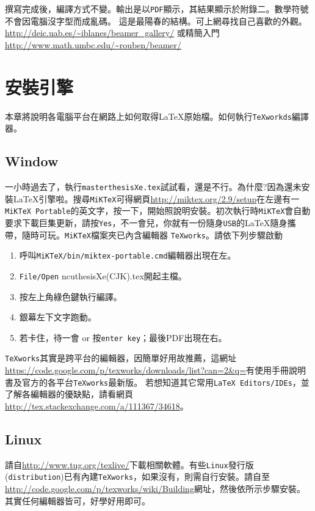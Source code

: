 撰寫完成後，編譯方式不變。輸出是以{\tt PDF}顯示，其結果顯示於附錄二。數學符號不會因電腦沒字型而成亂碼。
這是最陽春的結構。可上網尋找自己喜歡的外觀。\url{http://deic.uab.es/~iblanes/beamer_gallery/}
或精簡入門\url{http://www.math.umbc.edu/~rouben/beamer/}


\chapter{安裝引擎}
本章將說明各電腦平台在網路上如何取得\LaTeX{}原始檔。如何執行{\tt TeXworkds}編譯器。
\section{Window}
一小時過去了，執行{\tt masterthesisXe.tex}試試看，還是不行。為什麼?因為還未安裝\LaTeX{}引擎啦。搜尋{\tt MiKTeX}可得網頁\url{http://miktex.org/2.9/setup}在左邊有一{\tt MiKTeX Portable}的英文字，按一下，開始照說明安裝。初次執行時{\tt MiKTeX}會自動要求下載巨集更新，請按{\tt Yes}，不一會兒，你就有一份隨身{\tt USB}的\LaTeX{}隨身攜帶，隨時可玩。{\tt MiKTeX}檔案夾已內含編輯器 {\tt TeXworks}。請依下列步驟啟動

\begin{enumerate}
\item 呼叫{\tt MiKTeX/bin/miktex-portable.cmd}編輯器出現在左。
\item {\tt File/Open} ncuthesisXe(CJK).tex開起主檔。
\item 按左上角綠色鍵執行編譯。
\item 銀幕左下文字跑動。
\item 若卡住，待一會 or 按{\tt enter key}；最後PDF出現在右。
\end{enumerate}

{\tt TeXworks}其實是跨平台的編輯器，因簡單好用故推薦，這網址
\url{https://code.google.com/p/texworks/downloads/list?can=2&q=}有使用手冊說明書及官方的各平台{\tt TeXworks}最新版。
若想知道其它常用{\tt \LaTeX\ Editors/IDEs}，並了解各編輯器的優缺點，請看網頁\url{http://tex.stackexchange.com/a/111367/34618}。
\section{Linux}
請自\url{http://www.tug.org/texlive/}下載相關軟體。有些{\tt Linux}發行版({\tt distribution})已有內建{\tt TeXworks}，如果沒有，則需自行安裝。請自至
\url{http://code.google.com/p/texworks/wiki/Building}網址，然後依所示步驟安裝。其實任何編輯器皆可，好學好用即可。
